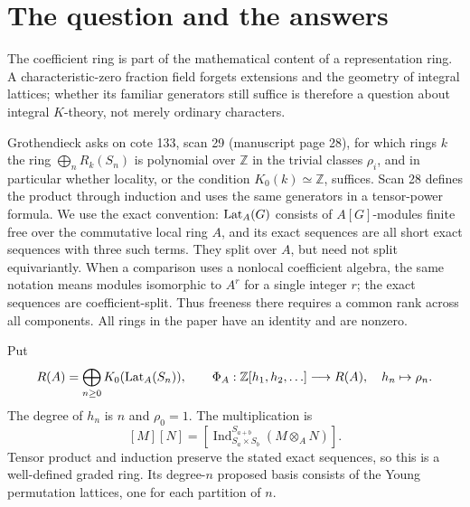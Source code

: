 \documentclass[11pt,a4paper]{article}
\theoremstyle{definition}\newtheorem{definition}[theorem]{Definition}
\theoremstyle{remark}\newtheorem{remark}[theorem]{Remark}
\newcommand{\Z}{\mathbb Z}\newcommand{\Q}{\mathbb Q}
\begin{document}
\section{The question and the answers}

The coefficient ring is part of the mathematical content of a
representation ring.  A characteristic-zero fraction field forgets
extensions and the geometry of integral lattices; whether its familiar
generators still suffice is therefore a question about integral
$K$-theory, not merely ordinary characters.

Grothendieck asks on cote 133, scan 29 (manuscript page 28), for which
rings $k$ the ring $\bigoplus_n R_k(S_n)$ is polynomial over $\Z$ in
the trivial classes $\rho_i$, and in particular whether locality, or
the condition $K_0(k)\simeq\Z$, suffices.  Scan 28 defines the product
through induction and uses the same generators in a tensor-power
formula.  We use the exact convention: $\operatorname{Lat}_A(G)$ consists of
$A[G]$-modules finite free over the commutative local ring $A$, and
its exact sequences are all short exact sequences with three such
terms.  They split over $A$, but need not split equivariantly.
When a comparison uses a nonlocal coefficient algebra, the same
notation means modules isomorphic to $A^r$ for a single integer $r$;
the exact sequences are coefficient-split.  Thus freeness there
requires a common rank across all components.
All rings in the paper have an identity and are nonzero.

Put
\[
 R(A)=\bigoplus_{n\geq0}K_0(\Lat_A(S_n)),\qquad
 \Phi_A:\Z[h_1,h_2,\ldots]\longrightarrow R(A),\quad h_n\mapsto\rho_n.
\]
The degree of $h_n$ is $n$ and $\rho_0=1$.  The multiplication is
\[
 [M][N]=\left[\operatorname{Ind}_{S_a\times S_b}^{S_{a+b}}
                  (M\otimes_A N)\right].
\]
Tensor product and induction preserve the stated exact sequences,
so this is a well-defined graded ring.  Its degree-$n$ proposed
basis consists of the Young permutation lattices, one for each
partition of $n$.
\end{document}
